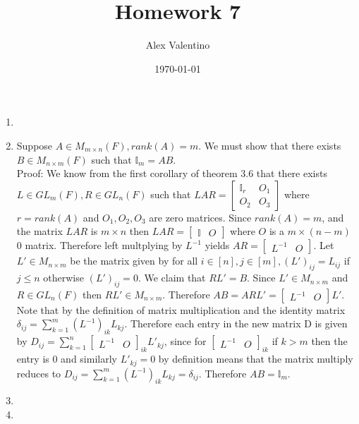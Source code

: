 \documentclass[12pt, letterpaper]{article}
\date{\today}
\author{Alex Valentino}
\title{Homework 7}
\begin{document}
\begin{enumerate}
	\item
	\newpage
	 \item Suppose $A \in M_{m \times n} (F), rank(A) = m$.  We must show that there exists $B \in M_{n \times m} (F)$ such that $\mathbb{I}_m = AB$.\\
	 Proof: We know from the first corollary of theorem 3.6 that there exists $L \in GL_m (F), R \in GL_n (F)$ such that $L A R = 
	 \begin{bmatrix} \mathbb{I}_r & O_1 \\ O_2 & O_3\end{bmatrix}$ where $r = rank(A)$ and $O_1,O_2,O_3$ are zero matrices.  Since $rank(A) = m$, and the matrix $LAR$ is $m \times n$ then $LAR = \left[ \begin{array}{c|c} \mathbb{I} & O \end{array} \right]$ where $O$ is a $m \times (n-m)$ 0 matrix. 
Therefore left multplying by $L^{-1}$ yields $AR = \left[ \begin{array}{c|c} L^{-1} & O \end{array} \right]$. 
Let $L' \in M_{n \times m}$ be the matrix given by for all $i \in [n], j \in [m], (L')_{ij} = L_{ij}$ if $j \leq n$ otherwise $(L')_{ij} = 0$.  We claim that $RL' = B$.  Since $L' \in M_{n \times m}$ and $R \in GL_n (F)$ then $RL' \in M_{n \times m}$.  Therefore $AB = ARL' =\left[ \begin{array}{c|c} L^{-1} & O \end{array} \right] L'$.  Note that by the definition of matrix multiplication and the identity matrix $\delta_{ij} = \sum_{k = 1}^m (L^{-1})_{ik} L_{kj}$.  Therefore each entry in the new matrix D is given by $ D_{ij} = \sum_{k = 1}^n \left[ \begin{array}{c|c} L^{-1} & O \end{array} \right]_{ik} L'_{kj}$, since for $\left[ \begin{array}{c|c} L^{-1} & O \end{array} \right]_{ik}$ if $k > m$ then the entry is 0 and similarly $L'_{kj} = 0$ by definition means that the matrix multiply reduces to $ D_{ij} = \sum_{k = 1}^m (L^{-1})_{ik} L_{kj} = \delta_{ij}$.  Therefore $AB = \mathbb{I}_m$.
	\newpage
	\item
	\newpage
	\item
	\newpage
\end{enumerate}
\end{document}
